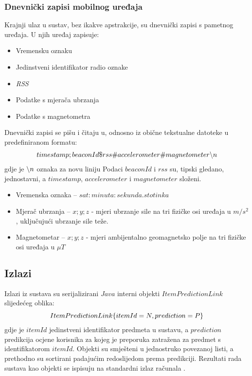 \documentclass[times, utf8, diplomski, numeric]{fer}
\begin{document}
\subsubsection{Dnevnički zapisi mobilnog uređaja}
Krajnji ulaz u sustav, bez ikakve apstrakcije, su dnevnički zapisi  s
pametnog uređaja. U njih uređaj zapisuje:
\begin{itemize}
  \item Vremensku oznaku
  \item Jedinstveni identifikator radio oznake
  \item \emph{RSS} 
  \item Podatke s mjerača ubrzanja 
  \item Podatke s magnetometra 
\end{itemize}
Dnevnički zapisi se pišu i čitaju u, odnosno iz obične tekstualne datoteke u
predefiniranom formatu:
\begin{equation}
	\centering
	timestamp;beaconId\$rss\#accelerometer\#magnetometer\char`\\n
\end{equation}
gdje je $\char`\\n$ oznaka za novu liniju 
Podaci $beaconId$ i $rss$ su, tipski gledano, jednostavni, a $timestamp$,
$accelerometer$ i $magnetometer$ složeni.

\begin{itemize}
  \item Vremenska oznaka -- $sat:minuta:sekunda.stotinka$
  \item Mjerač ubrzanja -- $x;y;z$ - mjeri ubrzanje sile na tri fizičke osi
  uređaja u $m/s^2$, uključujući ubrzanje sile teže.
  \item Magnetometar -- $x;y;z$ - mjeri ambijentalno geomagnetsko polje na tri
  fizičke osi uređaja u $\mu T$
\end{itemize}

\subsection{Izlazi}

Izlazi iz sustava su serijalizirani $Java$ interni objekti $ItemPredictionLink$
slijedećeg oblika:
\begin{equation}
	\centering
	ItemPredictionLink\{ 
		itemId=N,
		prediction=P
	\}
\end{equation}
gdje je $itemId$ jedinstveni identifikator predmeta u sustavu, a $prediction$
predikcija ocjene korisnika za kojeg je preporuka zatražena za predmet s
identifikatorom $itemId$. Objekti su smješteni u jednostruko povezanoj listi, a
prethodno su sortirani padajućim redoslijedom prema predikciji. Rezultati rada
sustava kao objekti se ispisuju na standardni izlaz računala .
\end{document}
